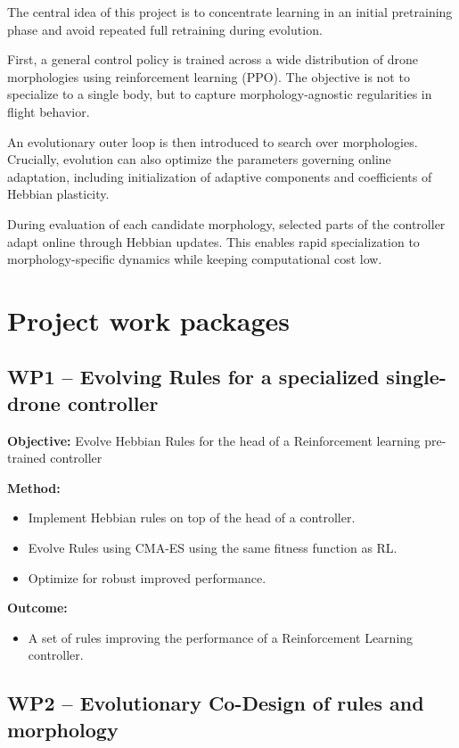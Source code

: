 \documentclass[letterpaper,10pt]{article}
\begin{document}
The central idea of this project is to concentrate learning in an initial pretraining phase and avoid repeated full retraining during evolution.

First, a general control policy is trained across a wide distribution of drone morphologies using reinforcement learning (PPO). The objective is not to specialize to a single body, but to capture morphology-agnostic regularities in flight behavior.

An evolutionary outer loop is then introduced to search over morphologies. Crucially, evolution can also optimize the parameters governing online adaptation, including initialization of adaptive components and coefficients of Hebbian plasticity.

During evaluation of each candidate morphology, selected parts of the controller adapt online through Hebbian updates. This enables rapid specialization to morphology-specific dynamics while keeping computational cost low.


\section{Project work packages}

\subsection*{WP1 -- Evolving Rules for a specialized single-drone controller}

\textbf{Objective:} Evolve Hebbian Rules for the head of a Reinforcement learning pre-trained controller

\textbf{Method:}
\begin{itemize}
    \item Implement Hebbian rules on top of the head of a controller.
    \item Evolve Rules using CMA-ES using the same fitness function as RL.
    \item Optimize for robust improved performance.
\end{itemize}

\textbf{Outcome:}
\begin{itemize}
    \item A set of rules improving the performance of a Reinforcement Learning controller.
\end{itemize}

\subsection*{WP2 -- Evolutionary Co-Design of rules and morphology}
\end{document}
